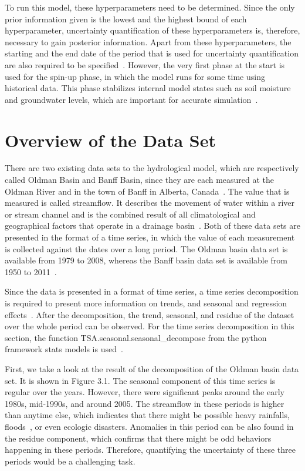 To run this model, these hyperparameters need to be determined. Since the only prior information given is the lowest and the highest bound of each hyperparameter, uncertainty quantification of these hyperparameters is, therefore, necessary to gain posterior information. Apart from these hyperparameters, the starting and the end date of the period that is used for uncertainty quantification are also required to be specified~\cite{hydrology}. However, the very first phase at the start is used for the spin-up phase, in which the model runs for some time using historical data. This phase stabilizes internal model states such as soil moisture and groundwater levels, which are important for accurate simulation~\cite{hydrology}.

\section{Overview of the Data Set}
There are two existing data sets to the hydrological model, which are respectively called Oldman Basin and Banff Basin, since they are each measured at the Oldman River and in the town of Banff in Alberta, Canada~\cite{hydrology_dataset}. The value that is measured is called streamflow. It describes the movement of water within a river or stream channel and is the combined result of all climatological and geographical factors that operate in a drainage basin~\cite{streamflow}. Both of these data sets are presented in the format of a time series, in which the value of each measurement is collected against the dates over a long period. The Oldman basin data set is available from 1979 to 2008, whereas the Banff basin data set is available from 1950 to 2011~\cite{hydrology}.

Since the data is presented in a format of time series, a time series decomposition is required to present more information on trends, and seasonal and regression effects~\cite{time_series}. After the decomposition, the trend, seasonal, and residue of the dataset over the whole period can be observed. For the time series decomposition in this section, the function TSA.seasonal.seasonal\_decompose from the python framework stats models is used~\cite{stat_models_decompose}.

First, we take a look at the result of the decomposition of the Oldman basin data set. It is shown in Figure 3.1. The seasonal component of this time series is regular over the years. However, there were significant peaks around the early 1980s, mid-1990s, and around 2005. The streamflow in these periods is higher than anytime else, which indicates that there might be possible heavy rainfalls, floods~\cite{hydrology}, or even ecologic disasters. Anomalies in this period can be also found in the residue component, which confirms that there might be odd behaviors happening in these periods. Therefore, quantifying the uncertainty of these three periods would be a challenging task.

